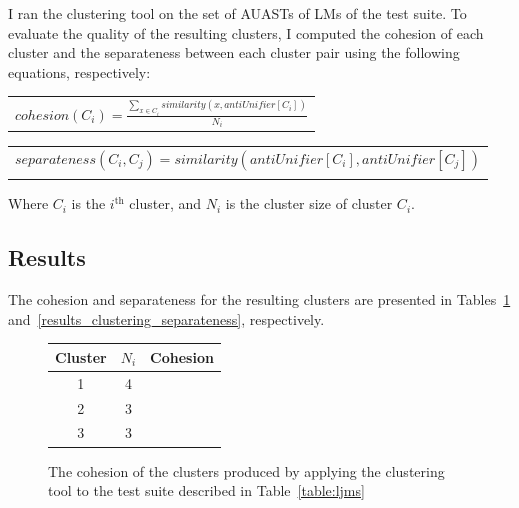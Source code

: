 I ran the clustering tool on the set of AUASTs of LMs of the test suite. To evaluate the quality of the resulting clusters, I computed the cohesion of each cluster and the separateness between each cluster pair using the following equations, respectively:


\begin{tabular}{c}
  $cohesion(C_i) = \frac{ \sum_{x \in C_i} similarity(x,antiUnifier[C_i] )}{N_i}$  \\  
\end{tabular}

\begin{tabular}{c}
  $separateness(C_i,C_j) =  similarity(antiUnifier[C_i],antiUnifier[C_j])$ \\ \\
\end{tabular}

Where $C_i$ is the  $i^{\text{th}}$ cluster, and $N_i$ is the cluster size of cluster ${C_i}$. 


\subsection{Results}  \label{study3-results}


The cohesion and separateness for the resulting clusters are presented in Tables~\ref{results_clustering_cohesion} and~\ref{results_clustering_separateness}, respectively.


\begin{figure} [H]
  \centering
  \begin{tabular}{ccc}
    \toprule
    {Cluster}&{$N_i$}&{Cohesion}\\
    
    \midrule
    1&4& \\
    \midrule
    2&3&\\
    \midrule
    3&3& \\
 	\bottomrule
  \end{tabular}
  \caption{The cohesion of the clusters produced by applying the clustering tool to the test suite described in Table~\ref{table:ljms}}
  \label{results_clustering_cohesion}
\end{figure}



